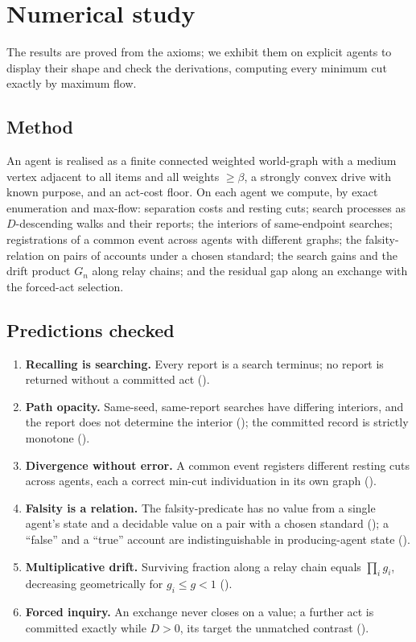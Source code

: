 \documentclass[11pt,twocolumn,a4paper]{article}
\newcommand{\flo}{\beta}
\newcommand{\dem}{D}
\begin{document}
\section{Numerical study}
\label{sec:validation}

The results are proved from the axioms; we exhibit them on explicit agents
to display their shape and check the derivations, computing every minimum cut
exactly by maximum flow.

\subsection{Method}

An agent is realised as a finite connected weighted world-graph with a
medium vertex adjacent to all items and all weights $\ge\flo$, a strongly
convex drive with known purpose, and an act-cost floor. On each agent we
compute, by exact enumeration and max-flow: separation costs and resting
cuts; search processes as $\dem$-descending walks and their reports; the
interiors of same-endpoint searches; registrations of a common event across
agents with different graphs; the falsity-relation on pairs of accounts under
a chosen standard; the search gains and the drift product $G_n$ along relay
chains; and the residual gap along an exchange with the forced-act selection.

\subsection{Predictions checked}

\begin{enumerate}[label=\textbf{(V\arabic*)},leftmargin=*]
\item \textbf{Recalling is searching.} Every report is a search terminus;
no report is returned without a committed act ().
\item \textbf{Path opacity.} Same-seed, same-report searches have differing
interiors, and the report does not determine the interior
(); the committed record is strictly monotone
().
\item \textbf{Divergence without error.} A common event registers different
resting cuts across agents, each a correct min-cut individuation in its own
graph ().
\item \textbf{Falsity is a relation.} The falsity-predicate has no value from
a single agent's state and a decidable value on a pair with a chosen standard
(); a ``false'' and a ``true''
account are indistinguishable in producing-agent state
().
\item \textbf{Multiplicative drift.} Surviving fraction along a relay chain
equals $\prod_i g_i$, decreasing geometrically for $g_i\le g<1$
().
\item \textbf{Forced inquiry.} An exchange never closes on a value; a further
act is committed exactly while $\dem>0$, its target the unmatched contrast
().
\end{enumerate}
\end{document}
